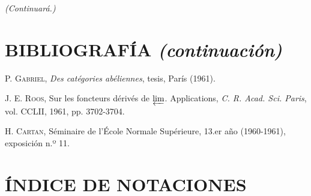 \begin{flushright}
\emph{(Continuará.)}
\end{flushright}

\clearpage
{}
\thispagestyle{empty}
\null
\clearpage
\thispagestyle{plain}

\section*{BIBLIOGRAFÍA \textit{(continuación)}}

\begin{flushleft}
[27] P. \textsc{Gabriel}, \emph{Des catégories abéliennes}, tesis, París (1961).

\medskip
[28] J. E. \textsc{Roos}, Sur les foncteurs dérivés de $\varprojlim$.
Applications, \emph{C. R. Acad. Sci. Paris}, vol. CCLII, 1961, pp. 3702-3704.

\medskip
[29] H. \textsc{Cartan}, Séminaire de l'École Normale Supérieure,
13.er año (1960-1961), exposición n.º 11.
\end{flushleft}

\clearpage
{}
\section*{ÍNDICE DE NOTACIONES}

